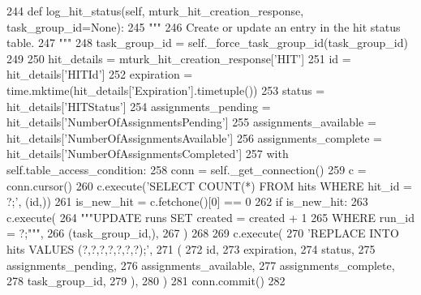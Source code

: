 \begin{DoxyCode}
244     \textcolor{keyword}{def }log\_hit\_status(self, mturk\_hit\_creation\_response, task\_group\_id=None):
245         \textcolor{stringliteral}{"""}
246 \textcolor{stringliteral}{        Create or update an entry in the hit status table.}
247 \textcolor{stringliteral}{        """}
248         task\_group\_id = self.\_force\_task\_group\_id(task\_group\_id)
249 
250         hit\_details = mturk\_hit\_creation\_response[\textcolor{stringliteral}{'HIT'}]
251         id = hit\_details[\textcolor{stringliteral}{'HITId'}]
252         expiration = time.mktime(hit\_details[\textcolor{stringliteral}{'Expiration'}].timetuple())
253         status = hit\_details[\textcolor{stringliteral}{'HITStatus'}]
254         assignments\_pending = hit\_details[\textcolor{stringliteral}{'NumberOfAssignmentsPending'}]
255         assignments\_available = hit\_details[\textcolor{stringliteral}{'NumberOfAssignmentsAvailable'}]
256         assignments\_complete = hit\_details[\textcolor{stringliteral}{'NumberOfAssignmentsCompleted'}]
257         with self.table\_access\_condition:
258             conn = self.\_get\_connection()
259             c = conn.cursor()
260             c.execute(\textcolor{stringliteral}{'SELECT COUNT(*) FROM hits WHERE hit\_id = ?;'}, (id,))
261             is\_new\_hit = c.fetchone()[0] == 0
262             \textcolor{keywordflow}{if} is\_new\_hit:
263                 c.execute(
264                     \textcolor{stringliteral}{"""UPDATE runs SET created = created + 1}
265 \textcolor{stringliteral}{                             WHERE run\_id = ?;"""},
266                     (task\_group\_id,),
267                 )
268 
269             c.execute(
270                 \textcolor{stringliteral}{'REPLACE INTO hits VALUES (?,?,?,?,?,?,?);'},
271                 (
272                     id,
273                     expiration,
274                     status,
275                     assignments\_pending,
276                     assignments\_available,
277                     assignments\_complete,
278                     task\_group\_id,
279                 ),
280             )
281             conn.commit()
282 
\end{DoxyCode}
\mbox{\label{classparlai_1_1mturk_1_1core_1_1mturk__data__handler_1_1MTurkDataHandler_a33facd12d38fa532a28a113b909073a6}} 
